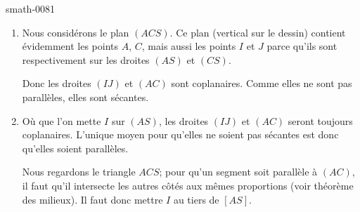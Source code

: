 
\begin{corrige}{smath-0081}

    \begin{enumerate}
        \item
            Nous considérons le plan \( (ACS)\). Ce plan (vertical sur le dessin) contient évidemment les points \( A\), \( C\), mais aussi les points \( I\) et \( J\) parce qu'ils sont respectivement sur les droites \( (AS)\) et \( (CS)\).

            Donc les droites \( (IJ)\) et \( (AC)\) sont coplanaires. Comme elles ne sont pas parallèles, elles sont sécantes.
        \item
            Où que l'on mette \( I\) sur \( (AS)\), les droites \( (IJ)\) et \( (AC)\) seront toujours coplanaires. L'unique moyen pour qu'elles ne soient pas sécantes est donc qu'elles soient parallèles.       

            Nous regardons le triangle \( ACS\); pour qu'un segment soit parallèle à \( (AC)\), il faut qu'il intersecte les autres côtés aux mêmes proportions (voir théorème des milieux). Il faut donc mettre \( I\) au tiers de \( [AS]\).
    \end{enumerate}

\end{corrige}

